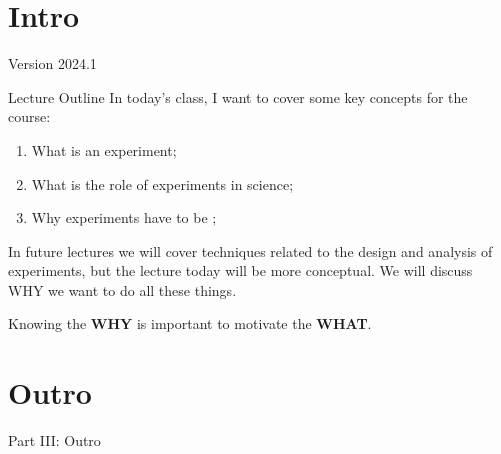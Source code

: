 \documentclass[aspectratio=169]{beamer}
\subtitle[Experimentalism]{Topic 01 - What is an experiment?}
\date{2023-04-19}
\begin{document}
\section{Intro}
\begin{frame}
  \maketitle

  \vfill

  \hfill Version 2024.1
\end{frame}

\begin{frame}[t]{Lecture Outline}
  In today's class, I want to cover some key concepts for the course: 
  \medskip

  \begin{enumerate}
    \item What is an experiment;
    \item What is the role of experiments in science;
    \item Why experiments have to be ;
  \end{enumerate}
  \bigskip

  In future lectures we will cover techniques related to the 
  design and analysis of experiments, but the lecture today will be more conceptual. We will discuss WHY we want to do all these things.
  \bigskip

  Knowing the {\bf WHY} is important to motivate the {\bf WHAT}.
\end{frame}




\section{Outro}

\begin{frame}
  \begin{center}
    Part III: Outro
  \end{center}
\end{frame}
\end{document}
